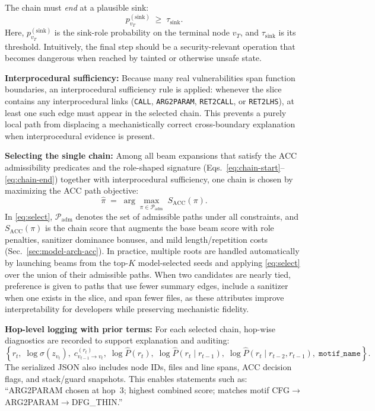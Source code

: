 \documentclass{buthesis}
\begin{document}
The chain must \emph{end} at a plausible sink:
\begin{equation}
\label{eq:chain-end}
p^{(\mathrm{sink})}_{v_T} \;\ge\; \tau_{\mathrm{sink}}.
\end{equation}
Here, $p^{(\mathrm{sink})}_{v_T}$ is the sink-role probability on the terminal node $v_T$, and $\tau_{\mathrm{sink}}$ is its threshold. Intuitively, the final step should be a security-relevant operation that becomes dangerous when reached by tainted or otherwise unsafe state.

\textbf{Interprocedural sufficiency:}
Because many real vulnerabilities span function boundaries, an interprocedural sufficiency rule is applied: whenever the slice contains any interprocedural links (\texttt{CALL}, \texttt{ARG2PARAM}, \texttt{RET2CALL}, or \texttt{RET2LHS}), at least one such edge must appear in the selected chain. This prevents a purely local path from displacing a mechanistically correct cross-boundary explanation when interprocedural evidence is present.

\textbf{Selecting the single chain:}
Among all beam expansions that satisfy the ACC admissibility predicates and the role-shaped signature (Eqs.~\eqref{eq:chain-start}--\eqref{eq:chain-end}) together with interprocedural sufficiency, one chain is chosen by maximizing the ACC path objective:
\begin{equation}
\label{eq:select}
\hat{\pi} \;=\; \arg\max_{\pi \in \mathcal{P}_{\mathrm{adm}}} \; S_{\mathrm{ACC}}(\pi).
\end{equation}
In \eqref{eq:select}, $\mathcal{P}_{\mathrm{adm}}$ denotes the set of admissible paths under all constraints, and $S_{\mathrm{ACC}}(\pi)$ is the chain score that augments the base beam score with role penalties, sanitizer dominance bonuses, and mild length/repetition costs (Sec.~\ref{sec:model-arch-acc}). In practice, multiple roots are handled automatically by launching beams from the top-$K$ model-selected seeds and applying \eqref{eq:select} over the union of their admissible paths. When two candidates are nearly tied, preference is given to paths that use fewer summary edges, include a sanitizer when one exists in the slice, and span fewer files, as these attributes improve interpretability for developers while preserving mechanistic fidelity.

\textbf{Hop-level logging with prior terms:}
For each selected chain, hop-wise diagnostics are recorded to support explanation and auditing:
\[
\left\{
r_t,\;
\log\sigma(z_{v_t}),\;
c^{(r_t)}_{v_{t-1}\to v_t},\;
\log \widehat{P}(r_t),\;
\log \widehat{P}(r_t \mid r_{t-1}),\;
\log \widehat{P}(r_t \mid r_{t-2},r_{t-1}),\;
\texttt{motif\_name}
\right\}.
\]
The serialized JSON also includes node IDs, files and line spans, ACC decision flags, and stack/guard snapshots. This enables statements such as:
“\textsc{ARG2PARAM} chosen at hop~3; highest combined score; matches motif
\textsc{CFG}$\!\to$\textsc{ARG2PARAM}$\!\to$\textsc{DFG\_THIN}.”
\end{document}
